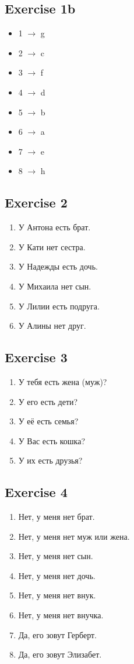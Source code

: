 \documentclass[a4paper, 11pt]{article}
\begin{document}
     \subsection{Exercise 1b}
     \begin{itemize}
       \item 1 $\rightarrow$ g
       \item 2 $\rightarrow$ c
       \item 3 $\rightarrow$ f
       \item 4 $\rightarrow$ d
       \item 5 $\rightarrow$ b
       \item 6 $\rightarrow$ a
       \item 7 $\rightarrow$ e
       \item 8 $\rightarrow$ h
     \end{itemize}
     \subsection{Exercise 2}
     \begin{enumerate}
      \item У Антона есть брат.
      \item У Кати нет сестра.
      \item У Надежды есть дочь.
      \item У Михаила нет сын.
      \item У Лилии есть подруга.
      \item У Алины нет друг.
     \end{enumerate}
    \subsection{Exercise 3}
    \begin{enumerate}
      \item У тебя есть жена (муж)?
      \item У его есть дети? 
      \item У её есть семья?
      \item У Вас есть кошка?
      \item У их есть друзья?
    \end{enumerate}
    \subsection{Exercise 4}
    \begin{enumerate}
      \item Нет, у меня нет брат.
      \item Нет, у меня нет муж или жена.
      \item Нет, у меня нет сын.
      \item Нет, у меня нет дочь.
      \item Нет, у меня нет внук.
      \item Нет, у меня нет внучка.
      \item Да, его зовут Герберт.
      \item Да, его зовут Элизабет.
    \end{enumerate}
\end{document}
